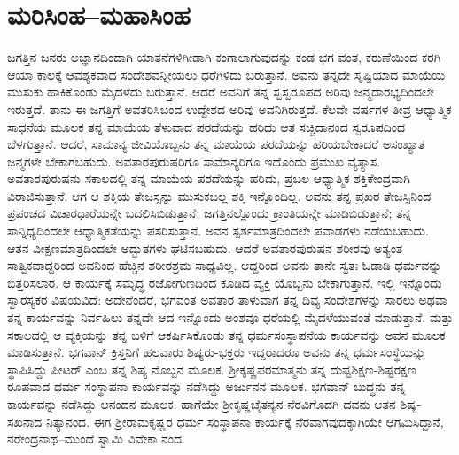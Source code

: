 
\chapter{ಮರಿಸಿಂಹ–ಮಹಾಸಿಂಹ}

\noindent

ಜಗತ್ತಿನ ಜನರು ಅಜ್ಞಾನದಿಂದಾಗಿ ಯಾತನೆಗಳಿಗೀಡಾಗಿ ಕಂಗಾಲಾಗುವುದನ್ನು ಕಂಡ ಭಗ ವಂತ, ಕರುಣೆಯಿಂದ ಕರಗಿ ಆಯಾ ಕಾಲಕ್ಕೆ ಆವಶ್ಯಕವಾದ ಸಂದೇಶವನ್ನೀಯಲು ಧರೆಗಿಳಿದು ಬರುತ್ತಾನೆ. ಅವನು ತನ್ನದೇ ಸೃಷ್ಟಿಯಾದ ಮಾಯೆಯ ಮುಸುಕು ಹಾಕಿಕೊಂಡು ಮೈದಳೆದು ಬರುತ್ತಾನೆ. ಆದರೆ ಅವನಿಗೆ ತನ್ನ ಸ್ವಸ್ವರೂಪದ ಅರಿವು ಜನ್ಮದಾರಭ್ಯದಿಂದಲೇ ಇರುತ್ತದೆ. ತಾನು ಈ ಜಗತ್ತಿಗೆ ಅವತರಿಸಿಬಂದ ಉದ್ದೇಶದ ಅರಿವು ಅವನಿಗಿರುತ್ತದೆ. ಕೆಲವೇ ವರ್ಷಗಳ ತೀವ್ರ ಆಧ್ಯಾತ್ಮಿಕ ಸಾಧನೆಯ ಮೂಲಕ ತನ್ನ ಮಾಯೆಯ ತೆಳುವಾದ ಪರದೆಯನ್ನು ಹರಿದು ಆತ ಸಚ್ಚಿದಾನಂದ ಸ್ವರೂಪದಿಂದ ಬೆಳಗುತ್ತಾನೆ. ಆದರೆ, ಸಾಮಾನ್ಯ ಜೀವಿಯೊಬ್ಬನು ತನ್ನ ಮಾಯೆಯ ಪರದೆಯನ್ನು ಹರಿಯಬೇಕಾದರೆ ಅಸಂಖ್ಯಾತ ಜನ್ಮಗಳೇ ಬೇಕಾಗಬಹುದು. ಅವತಾರಪುರುಷರಿಗೂ ಸಾಮಾನ್ಯರಿಗೂ ಇದೊಂದು ಪ್ರಮುಖ ವ್ಯತ್ಯಾಸ. ಅವತಾರಪುರುಷನು ಸಕಾಲದಲ್ಲಿ ತನ್ನ ಮಾಯೆಯ ಪರದೆಯನ್ನು ಹರಿದು, ಪ್ರಬಲ ಆಧ್ಯಾತ್ಮಿಕ ಶಕ್ತಿಕೇಂದ್ರವಾಗಿ ವಿರಾಜಿಸುತ್ತಾನೆ. ಆಗ ಆ ಶಕ್ತಿಯ ತೇಜಸ್ಸನ್ನು ಮುಸುಕಬಲ್ಲ ಶಕ್ತಿ ಇನ್ನೊಂದಿಲ್ಲ. ಅವನು ತನ್ನ ಪ್ರಖರ ತೇಜಸ್ಸಿನಿಂದ ಪ್ರಪಂಚದ ವಿಚಾರಧಾರೆಯನ್ನೇ ಬದಲಿಸಿಬಿಡುತ್ತಾನೆ; ಜಗತ್ತಿನಲ್ಲೊಂದು ಕ್ರಾಂತಿಯನ್ನೇ ಮಾಡಿಬಿಡುತ್ತಾನೆ; ತನ್ನ ಸಾನ್ನಿಧ್ಯದಿಂದಲೇ ಆಧ್ಯಾತ್ಮಿಕತೆಯನ್ನು ಪಸರಿಸುತ್ತಾನೆ. ಅವನ ಸ್ಪರ್ಶಮಾತ್ರದಿಂದಲೇ ಪವಾಡಗಳು ನಡೆಯಬಹುದು. ಆತನ ವೀಕ್ಷಣಮಾತ್ರದಿಂದಲೇ ಅದ್ಭುತಗಳು ಘಟಿಸಬಹುದು. ಆದರೆ ಅವತಾರಪುರುಷನ ಶರೀರವು ಅತ್ಯಂತ ಸಾತ್ವಿಕವಾದ್ದರಿಂದ ಅವನಿಂದ ಹೆಚ್ಚಿನ ಶರೀರಶ್ರಮ ಸಾಧ್ಯವಿಲ್ಲ. ಆದ್ದರಿಂದ ಅವನು ತಾನೇ ಸ್ವತಃ ಓಡಾಡಿ ಧರ್ಮವನ್ನು ಬಿತ್ತರಿಸಲಾರ. ಆ ಕಾರ್ಯಕ್ಕೆ ಸಮೃದ್ಧ ರಜೋಗುಣದಿಂದ ಕೂಡಿದ ವ್ಯಕ್ತಿ ಯೊಬ್ಬನು ಬೇಕಾಗುತ್ತಾನೆ. ಇಲ್ಲಿ ಇನ್ನೊಂದು ಸ್ವಾರಸ್ಯಕರ ವಿಷಯವಿದೆ: ಅದೇನೆಂದರೆ, ಭಗವಂತ ಅವತಾರ ತಾಳುವಾಗ ತನ್ನ ದಿವ್ಯ ಸಂದೇಶಗಳನ್ನು ಸಾರಲು ಅಥವಾ ತನ್ನ ಕಾರ್ಯವನ್ನು ನಿರ್ವಹಿಲು ತನ್ನದೇ ಆದ ಇನ್ನೊಂದು ಅಂಶವೂ ಧರೆಯಲ್ಲಿ ಮೈದಳೆಯುವಂತೆ ಮಾಡುತ್ತಾನೆ. ಮತ್ತು ಸಕಾಲದಲ್ಲಿ ಆ ವ್ಯಕ್ತಿಯನ್ನು ತನ್ನ ಬಳಿಗೆ ಆಕರ್ಷಿಸಿಕೊಂಡು ತನ್ನ ಧರ್ಮಸಂಸ್ಥಾಪನೆಯ ಕಾರ್ಯವನ್ನು ಅವನ ಮೂಲಕ ಮಾಡಿಸುತ್ತಾನೆ. ಭಗವಾನ್ ಕ್ರಿಸ್ತನಿಗೆ ಹಲವಾರು ಶಿಷ್ಯರು-ಭಕ್ತರು ಇದ್ದರಾದರೂ ಅವನು ತನ್ನ ಧರ್ಮಸಂಸ್ಥೆಯನ್ನು ಸ್ಥಾಪಿಸಿದ್ದು ಪೀಟರ್ ಎಂಬ ತನ್ನ ಶಿಷ್ಯ ನೊಬ್ಬನ ಮೂಲಕ. ಶ್ರೀಕೃಷ್ಣಪರಮಾತ್ಮನು ತನ್ನ ದುಷ್ಟಶಿಕ್ಷಣ-ಶಿಷ್ಟರಕ್ಷಣ ರೂಪವಾದ ಧರ್ಮ ಸಂಸ್ಥಾಪನಾ ಕಾರ್ಯವನ್ನು ನಡೆಸಿದ್ದು ಅರ್ಜುನನ ಮೂಲಕ. ಭಗವಾನ್ ಬುದ್ಧನು ತನ್ನ ಕಾರ್ಯವನ್ನು ನಡೆಸಿದ್ದು ಆನಂದನ ಮೂಲಕ. ಹಾಗೆಯೇ ಶ್ರೀಕೃಷ್ಣಚೈತನ್ಯನ ನೆರವಿಗೊದಗಿ ದವನು ಆತನ ಶಿಷ್ಯ-ಸಖನಾದ ನಿತ್ಯಾನಂದ. ಈಗ ಶ್ರೀರಾಮಕೃಷ್ಣರ ಧರ್ಮ ಸಂಸ್ಥಾಪನಾ ಕಾರ್ಯಕ್ಕೆ ನೆರವಾಗವುದಕ್ಕಾಗಿಯೇ ಆಗಮಿಸಿದ್ದಾನೆ, ನರೇಂದ್ರನಾಥ–ಮುಂದೆ ಸ್ವಾಮಿ ವಿವೇಕಾ ನಂದ.

